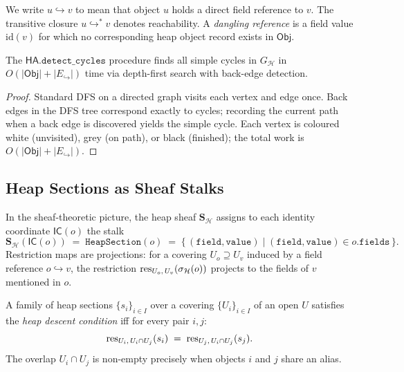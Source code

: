 \documentclass[11pt]{article}
\newcommand{\Heap}{\mathcal{H}}             %
\newcommand{\HeapObj}{\mathsf{Obj}}         %
\newcommand{\ptsto}{\hookrightarrow}        %
\newcommand{\HA}{\mathsf{HA}}               %
\newcommand{\IdentCoord}{\mathsf{IC}}       %
\newcommand{\SHeap}{\mathbf{S}_{\Heap}}    %
\newcommand{\SecHeap}{\sigma_{\Heap}}       %
\begin{document}
\begin{definition}
  \label{def:ptsto}
  We write $u \ptsto v$ to mean that object $u$ holds a direct field
  reference to $v$.  The transitive closure $u \ptsto^* v$ denotes
  reachability.  A \emph{dangling reference} is a field value
  $\mathrm{id}(v)$ for which no corresponding heap object record exists
  in $\HeapObj$.
\end{definition}

\begin{proposition}
  \label{prop:cycle}
  The $\HA.\mathtt{detect\_cycles}$ procedure finds all simple cycles in
  $G_\Heap$ in $O(|\HeapObj| + |E_\ptsto|)$ time via depth-first search
  with back-edge detection.
\end{proposition}
\begin{proof}
  Standard DFS on a directed graph visits each vertex and edge once.
  Back edges in the DFS tree correspond exactly to cycles; recording the
  current path when a back edge is discovered yields the simple cycle.
  Each vertex is coloured white (unvisited), grey (on path), or black
  (finished); the total work is $O(|\HeapObj| + |E_\ptsto|)$.
\end{proof}

\subsection{Heap Sections as Sheaf Stalks}

In the sheaf-theoretic picture, the heap sheaf $\SHeap$ assigns to each
identity coordinate $\IdentCoord(o)$ the stalk
\[
  \SHeap(\IdentCoord(o)) \;=\; \mathtt{HeapSection}(o) \;=\;
  \bigl\{\, (\mathtt{field}, \mathtt{value}) \;\big|\;
  (\mathtt{field}, \mathtt{value}) \in o.\mathtt{fields} \,\bigr\}.
\]
Restriction maps are projections: for a covering $U_o \supseteq U_v$
induced by a field reference $o \ptsto v$, the restriction
$\res_{U_o,\,U_v}(\SecHeap(o))$ projects to the fields of $v$ mentioned
in $o$.

\begin{definition}
  \label{def:heap-descent}
  A family of heap sections $\{s_i\}_{i \in I}$ over a covering
  $\{U_i\}_{i \in I}$ of an open $U$ satisfies the \emph{heap descent
  condition} iff for every pair $i, j$:
  \[
    \mathrm{res}_{U_i,\, U_i \cap U_j}(s_i) \;=\; \mathrm{res}_{U_j,\, U_i \cap U_j}(s_j).
  \]
  The overlap $U_i \cap U_j$ is non-empty precisely when objects $i$ and
  $j$ share an alias.
\end{definition}
\end{document}
